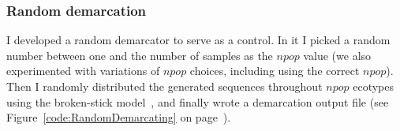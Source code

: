 \subsubsection*{Random demarcation}
I developed a random demarcator to serve as a control.
In it I picked a random number between one and the number of samples as the $npop$ value (we also experimented with variations of $npop$ choices, including using the correct $npop$). 
Then I randomly distributed the generated sequences throughout $npop$ ecotypes using the broken-stick model~\cite{tokeshi1990niche}, and finally wrote a demarcation output file (see Figure~\ref{code:RandomDemarcating} on page~\pageref{code:RandomDemarcating}).


